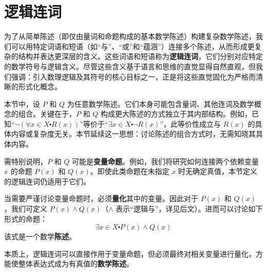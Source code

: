 \section{逻辑连词}

为了从简单陈述（即仅由量词和命题构成的基本数学陈述）构建复杂数学陈述，我们可以用特定词语和短语（如``与''、``或''和``蕴涵''）连接多个陈述，从而形成更复杂的结构并表达更深层的含义。这些词语和短语称为\textbf{逻辑连词}，它们分别对应特定的数学符号与逻辑含义。尽管这些含义基于语言和思维的直觉显得自然直观，但我们强调：引入数理逻辑及其符号的核心目标之一，正是将这些直觉固化为严格而清晰的形式化概念。

本节中，设 $P$ 和 $Q$ 为任意数学陈述。它们本身可能包含量词、其他连词及数学概念的组合。关键在于，$P$ 和 $Q$ 构成更大陈述的方式独立于其内部结构。例如，已知``$\neg(\forall x \in X \centerdot R(x))$''等价于``$\exists x \in X \centerdot \neg R(x)$''，此等价性成立与 $R(x)$ 的具体内容或复杂度无关。本节延续这一思想：讨论陈述的组合方式时，无需知晓其具体内容。

需特别说明，$P$ 和 $Q$ 可能是\textbf{变量命题}。例如，我们将研究如何连接两个依赖变量 $x$ 的命题 $P(x)$ 和 $Q(x)$。即使此类命题在未指定 $x$ 时无确定真值，本节定义的逻辑连词仍适用于它们。

当需要严谨讨论变量命题时，必须\textbf{量化}其中的变量。因此对于 $P(x)$ 和 $Q(x)$，我们可定义 $P(x) \land Q(x)$（$\land$ 表示``逻辑与''，详见后文）。进而可以讨论如下形式的命题：
\[\exists x \in X \centerdot P(x) \land Q(x)\]
该式是一个数学\textbf{陈述}。

本质上，逻辑连词可以直接作用于变量命题，但必须最终对相关变量进行量化，方能使整体表达式成为有真值的\textbf{数学陈述}。









